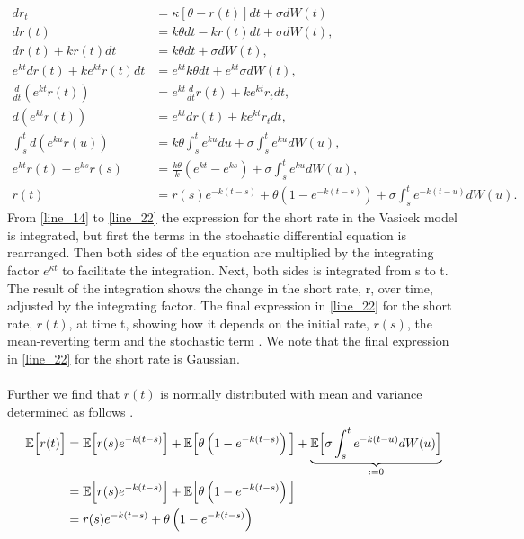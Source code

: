 \begin{align}
    d r_t &= \kappa \left[\theta - r(t)\right] dt + \sigma d W(t) \label{line_14} \\
    d r(t) &= k \theta dt - k r(t) dt + \sigma d W(t),  \\
    d r(t) + k r(t) dt &= k \theta dt + \sigma d W(t), \\
    e^{kt} d r(t) + k e^{kt} r(t) dt &= e^{kt} k \theta dt + e^{kt} \sigma d W(t), \\
    \frac{d}{dt} \left( e^{k t} r(t) \right) &= e^{k t} \frac{d}{dt} r(t) + k e^{k t} r_t dt, \\
    d\left( e^{k t} r(t) \right) &= e^{k t} dr(t) + k e^{k t} r_t dt, \\
    \int_s^t d \left( e^{ku} r(u) \right) &= k \theta \int_s^t e^{ku} du + \sigma \int_s^t e^{ku} d W(u), \\
    e^{kt} r(t) - e^{k s} r(s) &= \frac{k \theta}{k} \left( e^{kt} - e^{ks} \right) + \sigma \int_s^t e^{ku} d W(u), \\
    r(t) &= r(s) e^{-k(t-s)} + \theta \left( 1 - e^{-k(t-s)} \right) + \sigma \int_s^t e^{-k(t-u)} d W(u). \label{line_22}
\end{align}
From \autoref{line_14} to \autoref{line_22} the expression for the short rate in the Vasicek model is integrated, 
but first the terms in the stochastic differential equation is rearranged.
Then both sides of the equation are multiplied by the 
integrating factor $e^{\kappa t}$ to facilitate the integration. Next, both sides is integrated from s to t. The result of the
integration shows the change in the short  rate, r, over time, adjusted by the integrating factor. The final 
expression in \autoref{line_22} for the short rate, $r(t)$, at time t, showing how it depends on the initial rate, $r(s)$,
the mean-reverting term and the stochastic term \cite{Bermudan}. We note that the final expression in \autoref{line_22} for the short rate
is Gaussian.
\\\\
Further we find that $r(t)$ is normally distributed with mean and variance determined as follows \cite{Bjork}. 
\begin{align*}
    \mathbb{E} \Big[r(t)\Big] & = \mathbb{E} \Big[ r(s) e^{-k(t-s)} \Big] + \mathbb{E} \Big[\theta \left( 1 - e^{-k(t-s)} \right)\Big]
    + \underset{:=0}{\underbrace{\mathbb{E} \Big[\sigma \int_s^t e^{-k(t-u)} d W(u)\Big] }}\\
    & = \mathbb{E} \Big[ r(s) e^{-k(t-s)} \Big] + \mathbb{E} \Big[\theta \left( 1 - e^{-k(t-s)} \right)\Big] \\
    & = r(s) e^{-k(t-s)} + \theta \left( 1 - e^{-k(t-s)} \right) 
\end{align*}    

